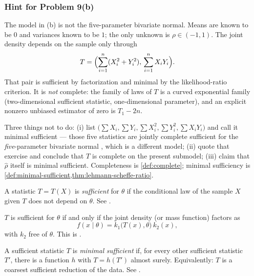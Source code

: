 \documentclass[11pt,a4paper]{article}
\begin{document}
\subsubsection{Hint for Problem 9(b)}

The model in (b) is not the five-parameter bivariate normal. Means are known to be \( 0 \) and variances known to be \( 1 \); the only unknown is \( \rho\in(-1,1) \). The joint density depends on the sample only through
\[
T
=
\Bigl(\sum_{i=1}^{n}(X_i^{2}+Y_i^{2}),\,\sum_{i=1}^{n}X_i Y_i\Bigr).
\]
That pair is sufficient by factorization and minimal by the likelihood-ratio criterion. It is \emph{not} complete: the family of laws of \( T \) is a curved exponential family (two-dimensional sufficient statistic, one-dimensional parameter), and an explicit nonzero unbiased estimator of zero is \( T_1-2n \).

Three things not to do: (i) list \( \bigl(\sum X_i,\sum Y_i,\sum X_i^{2},\sum Y_i^{2},\sum X_i Y_i\bigr) \) and call it minimal sufficient --- those five statistics are jointly complete sufficient for the \emph{five}-parameter bivariate normal \citep[Exercise~7.5.8]{hogg2019}, which is a different model; (ii) quote that exercise and conclude that \( T \) is complete on the present submodel; (iii) claim that \( \hat{\rho} \) itself is minimal sufficient. Completeness is \cref{def:complete}; minimal sufficiency is \cref{def:minimal-sufficient,thm:lehmann-scheffe-ratio}.

\begin{definition}
\label{def:sufficient}
A statistic \( T=T(X) \) is \emph{sufficient} for \( \theta \) if the conditional law of the sample \( X \) given \( T \) does not depend on \( \theta \). See \citep[\S7.2]{hogg2019}.
\end{definition}

\begin{theorem}
\label{thm:factorization}
\( T \) is sufficient for \( \theta \) if and only if the joint density (or mass function) factors as
\[
f(x\mid\theta)
=
k_1\bigl(T(x),\theta\bigr)\,k_2(x),
\]
with \( k_2 \) free of \( \theta \). This is \citep[Theorem~7.2.1]{hogg2019}.
\end{theorem}

\begin{definition}
\label{def:minimal-sufficient}
A sufficient statistic \( T \) is \emph{minimal sufficient} if, for every other sufficient statistic \( T' \), there is a function \( h \) with \( T=h(T') \) almost surely. Equivalently: \( T \) is a coarsest sufficient reduction of the data. See \citep[\S7.3]{hogg2019}.
\end{definition}
\end{document}
